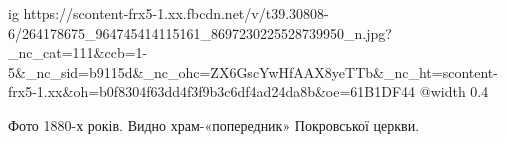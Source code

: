  
 
 
 
 

\ifcmt
  ig https://scontent-frx5-1.xx.fbcdn.net/v/t39.30808-6/264178675_964745414115161_8697230225528739950_n.jpg?_nc_cat=111&ccb=1-5&_nc_sid=b9115d&_nc_ohc=ZX6GscYwHfAAX8yeTTb&_nc_ht=scontent-frx5-1.xx&oh=b0f8304f63dd4f3f9b3c6df4ad24da8b&oe=61B1DF44
  @width 0.4
\fi

Фото 1880-х років. Видно храм-«попередник» Покровської церкви.
